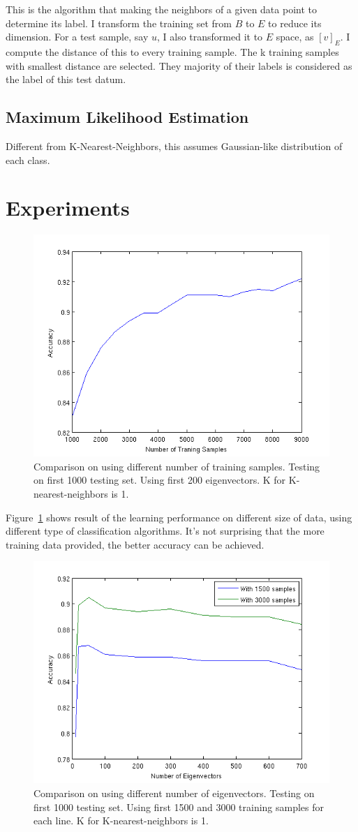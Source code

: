 \documentclass[10pt]{article}
\begin{document}
This is the algorithm that making the neighbors of a given data point
to determine its label. I transform the training set from $B$ to $E$ to
reduce its dimension. For a test sample, say $u$, I also transformed
it to $E$ space, as $[v]_E$. I compute the distance of this to every
training sample. The k training samples with smallest distance are
selected. They majority of their labels is considered as the label of
this test datum.

\subsection{Maximum Likelihood Estimation}

Different from K-Nearest-Neighbors, this assumes Gaussian-like
distribution of each class.

\section{Experiments}

\begin{figure}
\centering
\includegraphics[width=0.5\columnwidth]{diffDataSet.png}
\caption{Comparison on using different number of training samples.
Testing on first 1000 testing set. Using first 200 eigenvectors. K
for K-nearest-neighbors is 1.}
\label{fig:dataset}
\end{figure}

Figure~\ref{fig:dataset} shows result of the learning performance on
different size of data, using different type of classification
algorithms. It's not surprising that the more training data provided,
the better accuracy can be achieved.

\begin{figure}
\centering
\includegraphics[width=0.5\columnwidth]{diffEVector.png}
\caption{Comparison on using different number of eigenvectors.
Testing on first 1000 testing set. Using first 1500 and 3000 training
samples for each line.  K for K-nearest-neighbors is 1.}
\label{fig:evec}
\end{figure}
\end{document}

